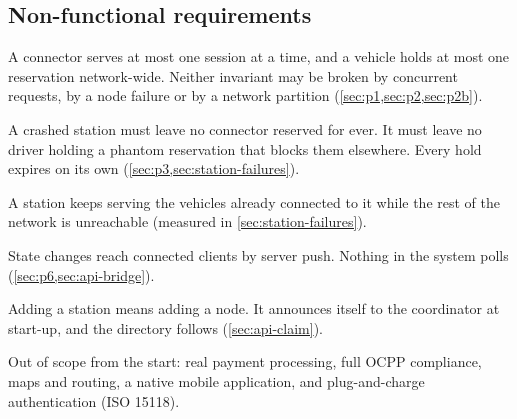 \subsection{Non-functional requirements}
\label{sec:non-functional}

\begin{description}[leftmargin=0pt, itemsep=3pt, font=\normalfont\itshape]
  \item[Exclusive use.] A connector serves at most one session at a time, and a vehicle
        holds at most one reservation network-wide. Neither invariant may be broken by
        concurrent requests, by a node failure or by a network partition
        (\cref{sec:p1,sec:p2,sec:p2b}).
  \item[No resource is lost to a failure.] A crashed station must leave no connector
        reserved for ever. It must leave no driver holding a phantom reservation that blocks
        them elsewhere. Every hold expires on its own
        (\cref{sec:p3,sec:station-failures}).
  \item[Station autonomy.] A station keeps serving the vehicles already connected to it
        while the rest of the network is unreachable (measured in
        \cref{sec:station-failures}).
  \item[Real time.] State changes reach connected clients by server push. Nothing in the
        system polls (\cref{sec:p6,sec:api-bridge}).
  \item[Horizontal growth.] Adding a station means adding a node. It announces itself to the
        coordinator at start-up, and the directory follows (\cref{sec:api-claim}).
\end{description}

Out of scope from the start: real payment processing, full OCPP compliance, maps and
routing, a native mobile application, and plug-and-charge authentication (ISO 15118).
